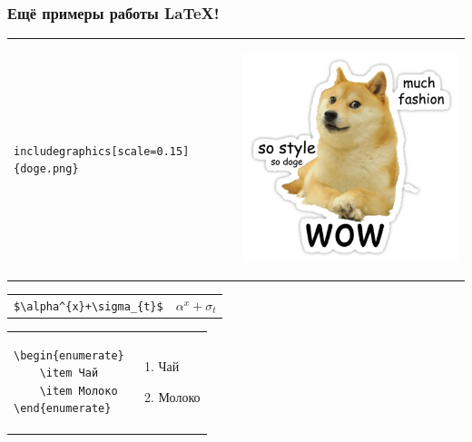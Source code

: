 \documentclass[newPxFont]{beamer}
\begin{document}
\begin{frame}[fragile]
\frametitle{Ещё примеры работы \LaTeX{}!} 

\begin{tabular}{p{5.5cm}p{4cm}}
\vspace{10mm} \verb|includegraphics[scale=0.15]{doge.png}| &  \begin{center} \includegraphics[scale=0.15]{doge.png} \end{center}
\end{tabular}
\begin{tabular}{p{5.5cm}p{4cm}}
\centering \verb|$\alpha^{x}+\sigma_{t}$| & \centering  $\alpha^{x}+\sigma_{t}$
\end{tabular}
\begin{tabular}{p{6.5cm}p{4cm}}
\begin{verbatim}
\begin{enumerate}
	\item Чай
	\item Молоко
\end{enumerate}
\end{verbatim} 
& \vspace{6mm} \begin{center}
\begin{enumerate}
	\item Чай
	\item Молоко
\end{enumerate}	 
\end{center} 
\end{tabular}
\end{frame}
\end{document}
